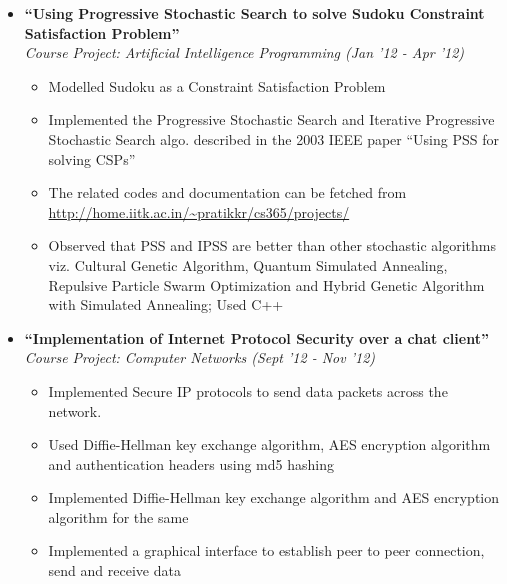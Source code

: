 \documentclass[margin,line]{resume}
\begin{document}
\begin{resume}
\begin{itemize}
  \item \large{\textbf{\textsf{``Using Progressive Stochastic Search to solve Sudoku Constraint Satisfaction Problem''}}}
    \\ \small{\textit{Course Project: Artificial Intelligence Programming (Jan '12 - Apr '12)}}
    \normalsize
    \begin{itemize}
    \item Modelled Sudoku as a Constraint Satisfaction Problem
    \item Implemented the Progressive Stochastic Search and Iterative Progressive Stochastic Search algo. described in the 2003 IEEE paper ``Using PSS for solving CSPs''
    \item The related codes and documentation can be fetched from \url{http://home.iitk.ac.in/~pratikkr/cs365/projects/}
    \item  Observed that PSS and IPSS are better than other stochastic algorithms viz. Cultural Genetic Algorithm, Quantum Simulated Annealing, Repulsive Particle Swarm Optimization and Hybrid Genetic Algorithm with Simulated Annealing; Used C++
    \end{itemize}

  \item \large{\textbf{\textsf{``Implementation of Internet Protocol Security over a chat client''}}}
    \\ \small{\textit{Course Project: Computer Networks (Sept '12 - Nov '12)}}
    \normalsize
    \begin{itemize}
    \item Implemented Secure IP protocols to send data packets across the network.
    \item Used Diffie-Hellman key exchange algorithm, AES encryption algorithm and authentication headers using md5 hashing
    \item Implemented Diffie-Hellman key exchange algorithm and AES encryption algorithm for the same
    \item Implemented a graphical interface to establish peer to peer connection, send and receive data
    \end{itemize}


\end{itemize}
\end{resume}
\end{document}
